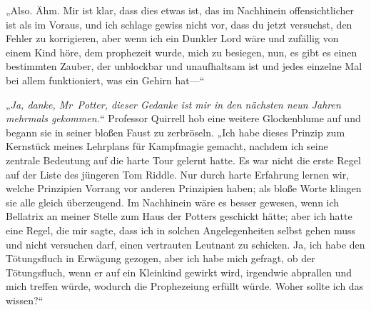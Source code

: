„Also. Ähm. Mir ist klar, dass dies etwas ist, das im Nachhinein offensichtlicher ist als im Voraus, und ich schlage gewiss nicht vor, dass du jetzt versuchst, den Fehler zu korrigieren, aber wenn ich ein Dunkler Lord wäre und zufällig von einem Kind höre, dem prophezeit wurde, mich zu besiegen, nun, es gibt es einen bestimmten Zauber, der unblockbar und unaufhaltsam ist und jedes einzelne Mal bei allem funktioniert, was ein Gehirn hat—“

„\emph{Ja, danke, Mr~Potter, dieser Gedanke ist mir in den nächsten neun Jahren mehrmals gekommen.}“
Professor Quirrell hob eine weitere Glockenblume auf und begann sie in seiner bloßen Faust zu zerbröseln.
„Ich habe dieses Prinzip zum Kernstück meines Lehrplans für Kampfmagie gemacht, nachdem ich seine zentrale Bedeutung auf die harte Tour gelernt hatte. Es war nicht die erste Regel auf der Liste des jüngeren Tom Riddle. Nur durch harte Erfahrung lernen wir, welche Prinzipien Vorrang vor anderen Prinzipien haben; als bloße Worte klingen sie alle gleich überzeugend. Im Nachhinein wäre es besser gewesen, wenn ich Bellatrix an meiner Stelle zum Haus der Potters geschickt hätte; aber ich hatte eine Regel, die mir sagte, dass ich in solchen Angelegenheiten selbst gehen muss und nicht versuchen darf, einen vertrauten Leutnant zu schicken. Ja, ich habe den Tötungsfluch in Erwägung gezogen, aber ich habe mich gefragt, ob der Tötungsfluch, wenn er auf ein Kleinkind gewirkt wird, irgendwie abprallen und mich treffen würde, wodurch die Prophezeiung erfüllt würde. Woher sollte ich das wissen?“


